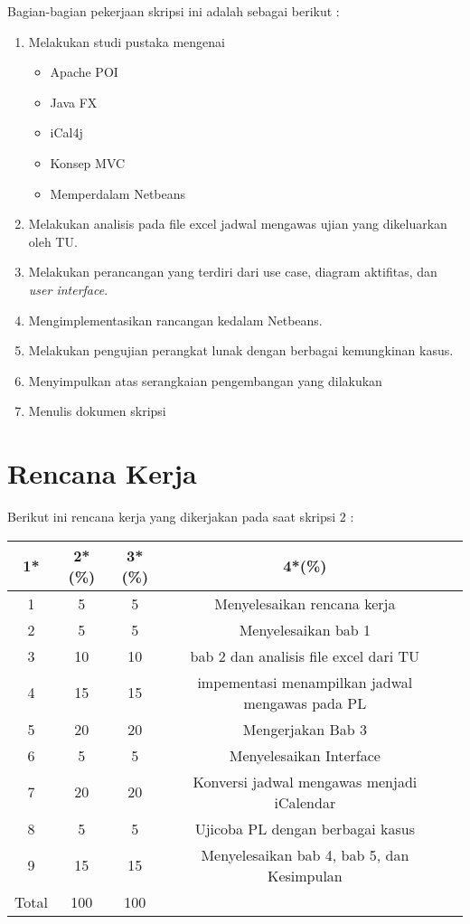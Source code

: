 \documentclass[a4paper,twoside]{article}
\begin{document}
Bagian-bagian pekerjaan skripsi ini adalah sebagai berikut :
	\begin{enumerate}
		\item Melakukan studi pustaka mengenai
			\begin{itemize}
				\item Apache POI
				\item Java FX
				\item iCal4j
				\item Konsep MVC
				\item Memperdalam Netbeans
			\end{itemize}
		\item Melakukan analisis pada file excel jadwal mengawas ujian yang dikeluarkan oleh TU.
		\item Melakukan perancangan yang terdiri dari use case, diagram aktifitas, dan \textit{user interface}.
		\item Mengimplementasikan rancangan kedalam Netbeans. 
		\item Melakukan pengujian perangkat lunak dengan berbagai kemungkinan kasus.
		\item Menyimpulkan atas serangkaian pengembangan yang dilakukan
		\item Menulis dokumen skripsi
	\end{enumerate}

\section{Rencana Kerja}
Berikut ini rencana kerja yang dikerjakan pada saat skripsi 2 :

\begin{center}
  \begin{tabular}{ | c | c | c | c | l |}
    \hline
    1*  & 2*(\%) & 3*(\%) & 4*(\%) \\ \hline \hline
    1   & 5  & 5  &   {\footnotesize Menyelesaikan rencana kerja} \\ \hline
    2   & 5 & 5  &    {\footnotesize Menyelesaikan bab 1}\\ \hline
    3   & 10  & 10  &  {\footnotesize bab 2 dan analisis file excel dari TU}  \\ \hline
    4   & 15  & 15  &   {\footnotesize impementasi menampilkan jadwal mengawas pada PL} \\ \hline
    5   & 20  & 20  &  {\footnotesize Mengerjakan Bab 3} \\ \hline
    6   & 5 &  5 &  {\footnotesize Menyelesaikan Interface}\\ \hline 
    7   & 20  & 20  &   {\footnotesize Konversi jadwal mengawas menjadi iCalendar}\\ \hline
    8   & 5  &  5 &   {\footnotesize Ujicoba PL dengan berbagai kasus}\\ \hline 
    9   & 15  & 15  &  {\footnotesize Menyelesaikan bab 4, bab 5, dan Kesimpulan}\\ \hline
    Total  & 100  & 100  &   \\ \hline
    \end{tabular}
\end{center}
\end{document}
